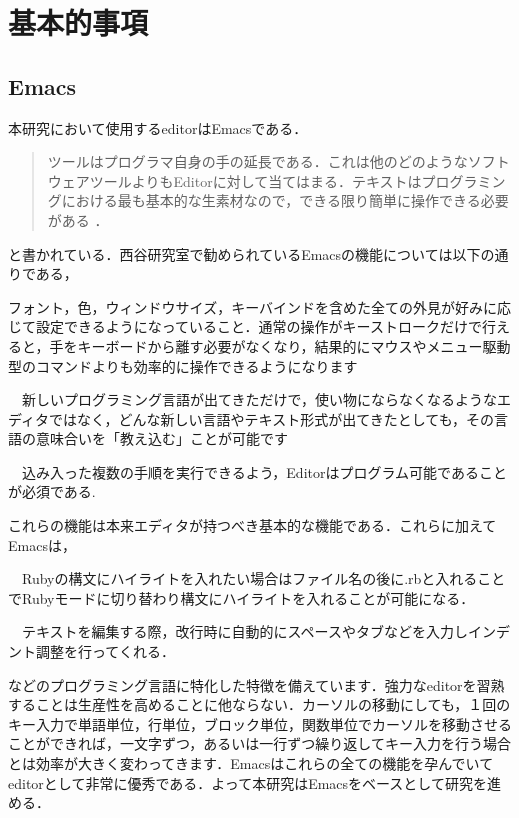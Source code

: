 \chapter{基本的事項}\label{ux57faux672cux7684ux4e8bux9805}

    \section{Emacs}\label{emacs}

    本研究において使用するeditorはEmacsである．
\begin{quotation}
ツールはプログラマ自身の手の延長である．これは他のどのようなソフトウェアツールよりもEditorに対して当てはまる．テキストはプログラミングにおける最も基本的な生素材なので，できる限り簡単に操作できる必要がある \cite{達人プログラマー}． 
\end{quotation}
と書かれている．西谷研究室で勧められているEmacsの機能については以下の通りである，

\begin{description}
\def\labelenumi{\arabic{enumi}.}
\tightlist
\item[設定可能である] フォント，色，ウィンドウサイズ，キーバインドを含めた全ての外見が好みに応じて設定できるようになっていること．通常の操作がキーストロークだけで行えると，手をキーボードから離す必要がなくなり，結果的にマウスやメニュー駆動型のコマンドよりも効率的に操作できるようになります
\item[拡張性がある]　新しいプログラミング言語が出てきただけで，使い物にならなくなるようなエディタではなく，どんな新しい言語やテキスト形式が出てきたとしても，その言語の意味合いを「教え込む」ことが可能です
\item[プログラム可能であること]　込み入った複数の手順を実行できるよう，Editorはプログラム可能であることが必須である.
\end{description}
これらの機能は本来エディタが持つべき基本的な機能である．これらに加えてEmacsは，

\begin{description}
\def\labelenumi{\arabic{enumi}.}
\tightlist
\item[構文のハイライト]　Rubyの構文にハイライトを入れたい場合はファイル名の後に.rbと入れることでRubyモードに切り替わり構文にハイライトを入れることが可能になる．
\item[自動インデント]　テキストを編集する際，改行時に自動的にスペースやタブなどを入力しインデント調整を行ってくれる．
\end{description}
などのプログラミング言語に特化した特徴を備えています．強力なeditorを習熟することは生産性を高めることに他ならない．カーソルの移動にしても，１回のキー入力で単語単位，行単位，ブロック単位，関数単位でカーソルを移動させることができれば，一文字ずつ，あるいは一行ずつ繰り返してキー入力を行う場合とは効率が大きく変わってきます．Emacsはこれらの全ての機能を孕んでいてeditorとして非常に優秀である．よって本研究はEmacsをベースとして研究を進める．

